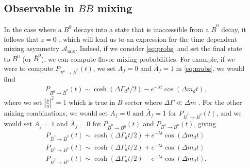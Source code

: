 \subsection{Observable in $B\bar{B}$ mixing}

In the case where a $B^0$ decays into a state that is inaccessible from a $\bar{B}^0$ decay, it follows that $z=0$ \cite{Bevan}, which will lead us to an expression for the time dependent mixing asymmetry $\mathcal{A}_{\text{mix}}$. Indeed, if we consider \ref{eq:probs} and set the final state to $B^0$ (or $\bar{B}^0$), we can compute flavor mixing probabilities. For example, if we were to compute $P_{B^0\rightarrow \bar{B}^0}(t)$, we set $A_f = 0$ and $\bar{A}_f = 1$ in \ref{eq:probs}, we would find
\begin{align}
\label{eq:prob1}
P_{B^0\rightarrow \bar{B}^0}(t) \sim \cosh(\Delta \Gamma_d t/2)-e^{-\lambda t}\cos(\Delta m_dt),
\end{align}
where we set $\left|\frac{p}{q}\right|^2=1$ which is true in $B$ sector where $\Delta \Gamma \ll \Delta m$ \cite{Bevan}. For the other mixing combinations, we would set $A_f = 0$ and $\bar{A}_f = 1$ for $P_{\bar{B}^0\rightarrow \bar{B}^0}(t)$, and we would set $A_f = 1$ and $\bar{A}_f = 0$ for $P_{\bar{B}^0\rightarrow B^0}(t)$ and $P_{B^0\rightarrow B^0}(t)$, giving
\begin{align}
P_{\bar{B}^0\rightarrow \bar{B}^0}(t) \sim \cosh(\Delta \Gamma_d t/2)+e^{-\lambda t}\cos(\Delta m_dt) \\
P_{B^0\rightarrow B^0}(t) \sim \cosh(\Delta \Gamma_d t/2)+e^{-\lambda t}\cos(\Delta m_dt)\\
\label{eq:prob2}
P_{\bar{B}^0\rightarrow B^0}(t) \sim \cosh(\Delta \Gamma_d t/2)-e^{-\lambda t}\cos(\Delta m_dt).
\end{align}

